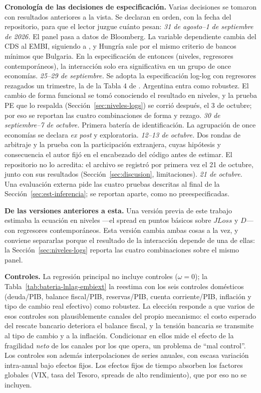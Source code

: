 \textbf{Cronología de las decisiones de especificación.} Varias decisiones se tomaron con resultados anteriores a la vista. Se declaran en orden, con la fecha del repositorio, para que el lector juzgue cuánto pesan: \textit{31 de agosto--1 de septiembre de 2026.} El panel pasa a datos de Bloomberg. La variable dependiente cambia del CDS al EMBI, siguiendo a \citet{Chari2024b}, y Hungría sale por el mismo criterio de bancos mínimos que Bulgaria. En la especificación de entonces (niveles, regresores contemporáneos), la interacción solo era significativa en un grupo de once economías. \textit{25--29 de septiembre.} Se adopta la especificación log-log con regresores rezagados un trimestre, la de la Tabla 4 de \citet{Chari2024b}. Argentina entra como robustez. El cambio de forma funcional se tomó conociendo el resultado en niveles, y la prueba PE que lo respalda (Sección~\ref{sec:niveles-logs}) se corrió después, el 3 de octubre; por eso se reportan las cuatro combinaciones de forma y rezago. \textit{30 de septiembre--7 de octubre.} Primera batería de identificación. La agrupación de once economías se declara \textit{ex post} y exploratoria. \textit{12--13 de octubre.} Dos rondas de arbitraje y la prueba con la participación extranjera, cuyas hipótesis y consecuencia el autor fijó en el encabezado del código antes de estimar. El repositorio no lo acredita: el archivo se registró por primera vez el 21 de octubre, junto con sus resultados (Sección~\ref{sec:discusion}, limitaciones). \textit{21 de octubre.} Una evaluación externa pide las cuatro pruebas descritas al final de la Sección~\ref{sec:est-inferencia}; se reportan aparte, como no preespecificadas.

\textbf{De las versiones anteriores a esta.} Una versión previa de este trabajo estimaba la ecuación en niveles ---el spread en puntos básicos sobre $JLoss$ y $D$--- con regresores contemporáneos. Esta versión cambia ambas cosas a la vez, y conviene separarlas porque el resultado de la interacción depende de una de ellas: la Sección~\ref{sec:niveles-logs} reporta las cuatro combinaciones sobre el mismo panel.

\textbf{Controles.} La regresión principal no incluye controles ($\omega=0$); la Tabla~\ref{tab:bateria-lnlag-embiext} la reestima con los seis controles domésticos (deuda/PIB, balance fiscal/PIB, reservas/PIB, cuenta corriente/PIB, inflación y tipo de cambio real efectivo) como robustez. La elección responde a que varios de esos controles son plausiblemente canales del propio mecanismo: el costo esperado del rescate bancario deteriora el balance fiscal, y la tensión bancaria se transmite al tipo de cambio y a la inflación. Condicionar en ellos mide el efecto de la fragilidad \emph{neto} de los canales por los que opera, un problema de ``mal control''. Los controles son además interpolaciones de series anuales, con escasa variación intra-anual bajo efectos fijos. Los efectos fijos de tiempo absorben los factores globales (VIX, tasa del Tesoro, spreads de alto rendimiento), que por eso no se incluyen.

